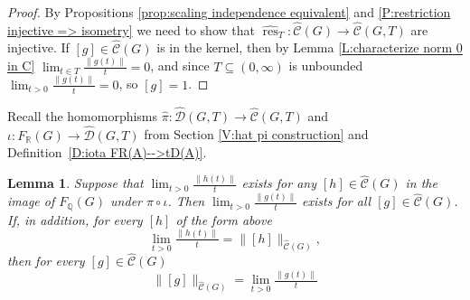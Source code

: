 \documentclass[12pt]{amsart}
\newtheorem{lemma}[prop]{Lemma}
\theoremstyle{definition}
\def\QQ{\ensuremath{\mathbb{Q}}}
\def\RR{\ensuremath{\mathbb{R}}}
\def\res{\operatorname{res}}
\newcommand{\OP}[1]{\operatorname{#1}}
\def\Cone{\OP{Cone}}
\def\Free{F}
\def\D{\mathcal{D}}
\def\tC{\hat{\mathcal{C}}}
\def\tD{\hat{\D}}
\begin{document}
\begin{proof}
By Propositions \ref{prop:scaling independence equivalent} and \ref{P:restriction injective => isometry} we need to show that $\widehat{\res}_T \colon \tC(G) \to \tC(G,T)$ are injective.
If $[g] \in \tC(G)$ is in the kernel, then by Lemma \ref{L:characterize norm 0 in C} $\lim_{t \in T} \tfrac{\|g(t)\|}{t}=0$, and since $T \subseteq (0,\infty)$ is unbounded $\lim_{t >0} \tfrac{\|g(t)\|}{t}=0$, so $[g]=1$.
\end{proof}











Recall the homomorphisms $\hat{\pi} \colon \tD(G,T) \to \tC(G,T)$ and $\iota \colon \Free_\RR(G) \to \tD(G,T)$ from Section \ref{V:hat pi construction} and Definition~\ref{D:iota FR(A)-->tD(A)}.





\begin{lemma}\label{L:limit g(t) exists if on FQG}
Suppose that $\lim_{t >0} \tfrac{\|h(t)\|}{t}$ exists for any $[h] \in \tC(G)$ %
in the image of $\Free_\QQ(G)$ under $\hat{\pi} \circ \iota$.
Then $\lim_{t>0} \tfrac{\|g(t)\|}{t}$ exists for all $[g] \in \tC(G)$.
If, in addition, for every $[h]$ of the form above
\[
\lim_{t >0} \tfrac{\|h(t)\|}{t}=\|[h]\|_{\tC(G)},
\]
then for every $[g] \in \tC(G)$ 
\[
\| [g] \|_{\tC(G)} = \lim_{t>0} \tfrac{\|g(t)\|}{t}
\]
\end{lemma}
\end{document}
